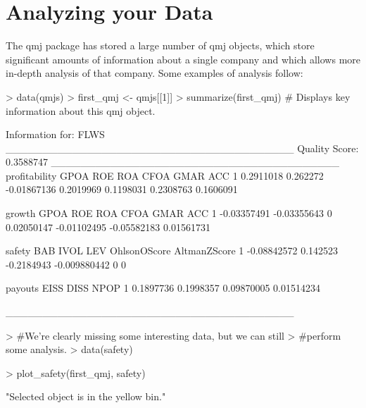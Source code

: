 \documentclass[12pt]{article}
\begin{document}
\section*{Analyzing your Data}
The qmj package has stored a large number of qmj objects, which store significant amounts of information about a single company and which allows more in-depth analysis of that company. Some examples of analysis follow:
\begin{Schunk}
\begin{Sinput}
> data(qmjs)
> first_qmj <- qmjs[[1]]
> summarize(first_qmj) # Displays key information about this qmj object.
\end{Sinput}
\begin{Soutput}
Information for:  FLWS
_______________________________________
Quality Score:  0.3588747
_______________________________________
  profitability     GPOA         ROE       ROA      CFOA      GMAR       ACC
1     0.2911018 0.262272 -0.01867136 0.2019969 0.1198031 0.2308763 0.1606091


       growth        GPOA ROE        ROA        CFOA        GMAR        ACC
1 -0.03357491 -0.03355643   0 0.02050147 -0.01102495 -0.05582183 0.01561731


       safety      BAB       IVOL          LEV OhlsonOScore AltmanZScore
1 -0.08842572 0.142523 -0.2184943 -0.009880442            0            0


    payouts      EISS       DISS       NPOP
1 0.1897736 0.1998357 0.09870005 0.01514234

_______________________________________
\end{Soutput}
\begin{Sinput}
> #We're clearly missing some interesting data, but we can still 
> #perform some analysis.
> data(safety)
\end{Sinput}
\end{Schunk}
\begin{Schunk}
\begin{Sinput}
> plot_safety(first_qmj, safety)
\end{Sinput}
\begin{Soutput}
[1] "Selected object is in the yellow bin."
\end{Soutput}
\end{Schunk}
\end{document}
